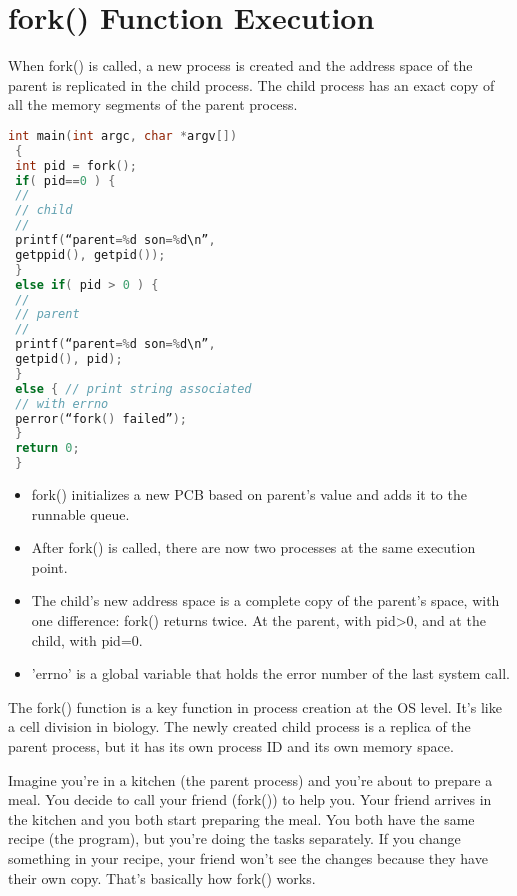 \documentclass[12pt]{report}
\begin{document}
 \section{fork() Function Execution} 
 When fork() is called, a new process is created and the address space of the parent is replicated in the child process. The child process has an exact copy of all the memory segments of the parent process.
\begin{lstlisting}[language=C] 
 int main(int argc, char *argv[]) 
 { 
 int pid = fork(); 
 if( pid==0 ) { 
 // 
 // child 
 // 
 printf(“parent=%d son=%d\n”, 
 getppid(), getpid()); 
 } 
 else if( pid > 0 ) { 
 // 
 // parent 
 // 
 printf(“parent=%d son=%d\n”, 
 getpid(), pid); 
 } 
 else { // print string associated 
 // with errno 
 perror(“fork() failed”); 
 } 
 return 0; 
 } 
 \end{lstlisting}
\begin{tcolorbox}[colback=yellow!5, colframe=yellow!80!black, title={\faBookmark Key Points}] 
 \begin{itemize} 
 \item fork() initializes a new PCB based on parent’s value and adds it to the runnable queue. 
 \item After fork() is called, there are now two processes at the same execution point. 
 \item The child’s new address space is a complete copy of the parent’s space, with one difference: fork() returns twice. At the parent, with pid>0, and at the child, with pid=0. 
 \item 'errno' is a global variable that holds the error number of the last system call. 
 \end{itemize} 
 \end{tcolorbox}
\begin{tcolorbox}[colback=green!5, colframe=green!75!black, title={\faLightbulb Intuition}] 
 The fork() function is a key function in process creation at the OS level. It's like a cell division in biology. The newly created child process is a replica of the parent process, but it has its own process ID and its own memory space. 
 \end{tcolorbox}
\begin{tcolorbox}[colback=blue!5, colframe=blue!75!black, title={\faLightbulb Simple Explanation}] 
 Imagine you're in a kitchen (the parent process) and you're about to prepare a meal. You decide to call your friend (fork()) to help you. Your friend arrives in the kitchen and you both start preparing the meal. You both have the same recipe (the program), but you're doing the tasks separately. If you change something in your recipe, your friend won't see the changes because they have their own copy. That's basically how fork() works. 
 \end{tcolorbox}
\end{document}

